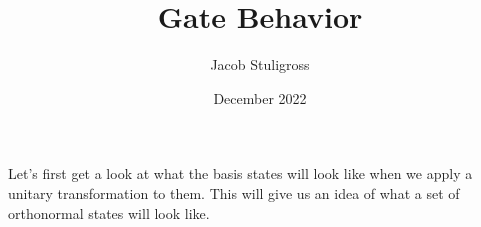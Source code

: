 \documentclass{article}
\title{Gate Behavior}
\author{Jacob Stuligross}
\date{December 2022}
\begin{document}
\maketitle

Let's first get a look at what the basis states will look like when we apply a unitary transformation to them.
This will give us an idea of what a set of orthonormal states will look like.

\begin{align*}
  
\end{align*}
\end{document}
